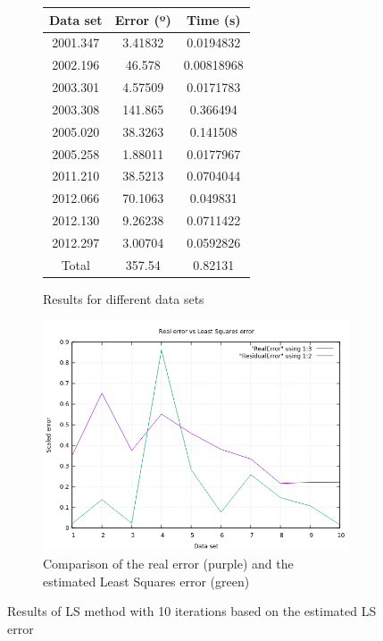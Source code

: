\begin{figure}[!htb]
	\begin{subfigure}[b]{0.5\textwidth}
		\begin{centering}
		\def\arraystretch{1.2}
		\begin{tabular}{|c c c|} 
			\hline
			Data set & Error (º) & Time (s) \\ [0.5ex] 
			\hline\hline
			2001.347 & 3.41832 & 0.0194832 \\
			\hline
			2002.196 & 46.578 & 0.00818968 \\
			\hline
			2003.301 & 4.57509 & 0.0171783 \\
			\hline
			2003.308 & 141.865 & 0.366494 \\
			\hline
			2005.020 & 38.3263 & 0.141508 \\
			\hline
			2005.258 & 1.88011 & 0.0177967 \\
			\hline
			2011.210 & 38.5213 & 0.0704044 \\
			\hline
			2012.066 & 70.1063 & 0.049831 \\
			\hline
			2012.130 & 9.26238 & 0.0711422 \\
			\hline
			2012.297 & 3.00704 & 0.0592826 \\
			\hline
			Total & 357.54 & 0.82131 \\
			\hline
		\end{tabular}
		\caption{Results for different data sets}
	\end{centering}
	\end{subfigure}
	\hfill
	\begin{subfigure}[b]{0.5\textwidth}	
		\includegraphics[width=\linewidth]{images/results/comparisonErrors.png}
		\caption{Comparison of the real error (purple) and the estimated Least Squares error (green)}
		\label{fig:comparisonErrorsLS}
	\end{subfigure}
	\caption{Results of LS method with 10 iterations based on the estimated LS error}
	\label{fig:iterationsLSwithFigure}
\end{figure}

